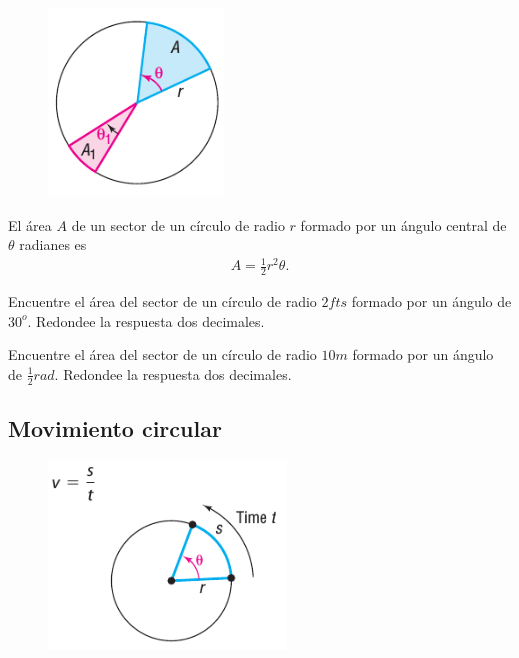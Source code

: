 {}
	\begin{figure}[h]
		\centering
		\includegraphics[height=5cm,keepaspectratio=true]{./trig/sull6115.png}
		\label{fig:sull6115}
	\end{figure}

{}
	\begin{thm}
		El área $A$ de un sector de un círculo de radio $r$ formado por un ángulo central de $\theta$ radianes es 
		\begin{align}
			\label{sull6108}
			A=\frac{1}{2}r^{2}\theta.
		\end{align}
	\end{thm}
	

{}
	\begin{problema}
		\label{exmp:sull6107}
		Encuentre el área del sector de un círculo de radio $2fts$ formado por un ángulo de $30^{o}$. Redondee la respuesta dos decimales.  
	\end{problema}
	

{}
	\begin{problema}
		Encuentre el área del sector de un círculo de radio $10m$ formado por un ángulo de $\frac{1}{2}rad$. Redondee la respuesta dos decimales.  
	\end{problema}
	

\subsection{Movimiento circular}
{}
	\begin{figure}[h]
		\centering
		\includegraphics[height=5cm,keepaspectratio=true]{./trig/sull6116.png}
		\label{fig:sull6116}
	\end{figure}
	

